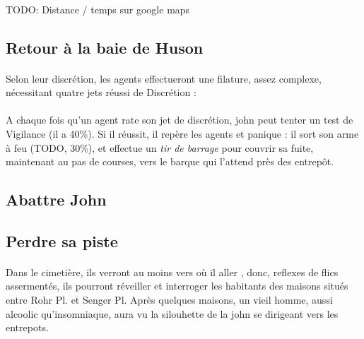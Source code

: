 \paragraph{} TODO: Distance / temps sur google maps

\subsection{Retour à la baie de Huson}

\paragraph{} Selon leur discrétion, les agents effectueront une filature, assez complexe, nécessitant quatre jets réussi de Discrétion :
\begin{itemize}
\end{itemize}



\paragraph{} A chaque fois qu'un agent rate son jet de discrétion, \gls{john} peut tenter un test de Vigilance (il a 40\%). Si il réussit, il 
repère les agents et panique : il sort son arme à feu (TODO, 30\%), et effectue un \emph{tir de barrage} pour couvrir sa fuite, maintenant au 
pas de courses, vers le barque qui l'attend près des entrepôt.

\subsection{Abattre John}


\subsection{Perdre sa piste}

\paragraph{} Dans le cimetière, ils verront au moins vers où il aller , donc, reflexes de flics assermentés, ils pourront réveiller et interroger les 
habitants des maisons situés entre Rohr Pl. et Senger Pl. Après quelques maisons, un vieil homme, aussi alcoolic qu'insomniaque, aura vu la
silouhette de la \gls{john} se dirigeant vers les entrepots.

